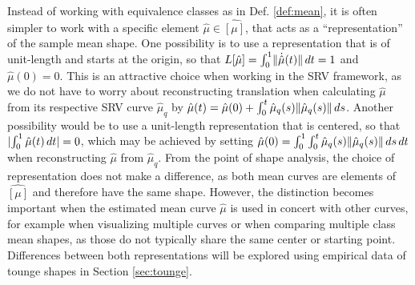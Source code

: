 Instead of working with equivalence classes as in Def. \ref{def:mean}, it is often simpler to work with a specific element $\hat\mu \in \hat{[\mu]}$, that acts as a \enquote{representation} of the sample mean shape.
One possibility is to use a representation that is of unit-length and starts at the origin, so that $L[\hat\mu] = \int_0^1 \lVert\dot{\hat\mu}(t)\rVert\, dt = 1$ and $\hat\mu(0) = 0$.
This is an attractive choice when working in the SRV framework, as we do not have to worry about reconstructing translation when calculating $\hat\mu$ from its respective SRV curve $\hat\mu_q$ by $\hat\mu(t) = \hat\mu(0) + \int_0^t \hat\mu_q(s) \lVert\hat\mu_q(s)\rVert\,ds$.
Another possibility would be to use a unit-length representation that is centered, so that $\lvert\int_0^1 \hat\mu(t)\, dt\rvert = 0$, which may be achieved by setting $\hat\mu(0) = \int_0^1 \int_0^t \hat\mu_q(s) \lVert \hat\mu_q(s)\rVert\,ds\,dt$ when reconstructing $\hat\mu$ from $\hat\mu_q$.
From the point of shape analysis, the choice of representation does not make a difference, as both mean curves are elements of $\hat{[\mu]}$ and therefore have the same shape.
However, the distinction becomes important when the estimated mean curve $\hat\mu$ is used in concert with other curves, for example when visualizing multiple curves or when comparing multiple class mean shapes, as those do not typically share the same center or starting point.
Differences between both representations will be explored using empirical data of tounge shapes in Section \ref{sec:tounge}.

